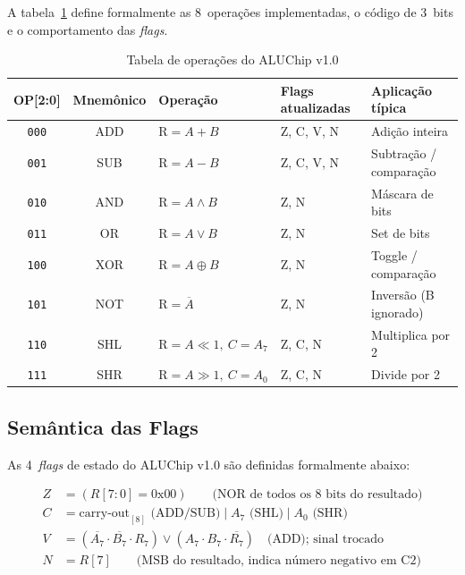 \documentclass[12pt,a4paper]{article}
\begin{document}
A tabela~\ref{tab:ops} define formalmente as 8~operações implementadas, o código de 3~bits e o comportamento das \textit{flags}.

\begin{table}[h!]
\centering
\caption{Tabela de operações do ALUChip v1.0}
\label{tab:ops}
\begin{tabular}{c c l l l}
\toprule
\textbf{OP[2:0]} & \textbf{Mnemônico} & \textbf{Operação} & \textbf{Flags atualizadas} & \textbf{Aplicação típica} \\
\midrule
\texttt{000} & ADD  & $\text{R} = A + B$         & Z, C, V, N & Adição inteira \\
\texttt{001} & SUB  & $\text{R} = A - B$         & Z, C, V, N & Subtração / comparação \\
\texttt{010} & AND  & $\text{R} = A \land B$     & Z, N       & Máscara de bits \\
\texttt{011} & OR   & $\text{R} = A \lor B$      & Z, N       & Set de bits \\
\texttt{100} & XOR  & $\text{R} = A \oplus B$    & Z, N       & Toggle / comparação \\
\texttt{101} & NOT  & $\text{R} = \overline{A}$  & Z, N       & Inversão (B ignorado) \\
\texttt{110} & SHL  & $\text{R} = A \ll 1,\ C = A_7$ & Z, C, N  & Multiplica por 2 \\
\texttt{111} & SHR  & $\text{R} = A \gg 1,\ C = A_0$ & Z, C, N  & Divide por 2 \\
\bottomrule
\end{tabular}
\end{table}

\subsection{Semântica das Flags}

As 4~\textit{flags} de estado do ALUChip v1.0 são definidas formalmente abaixo:

\begin{align}
  Z &= (R[7:0] = 0\text{x}00)
    \qquad\text{(NOR de todos os 8~bits do resultado)} \label{eq:z}\\
  C &= \text{carry-out}_{[8]} \text{ (ADD/SUB)}
     \;|\; A_7 \text{ (SHL)}
     \;|\; A_0 \text{ (SHR)} \label{eq:c}\\
  V &= (\overline{A_7} \cdot \overline{B_7} \cdot R_7) \lor (A_7 \cdot B_7 \cdot \overline{R_7})
    \quad\text{(ADD); sinal trocado} \label{eq:v}\\
  N &= R[7]
    \qquad\text{(MSB do resultado, indica número negativo em C2)} \label{eq:n}
\end{align}
\end{document}
